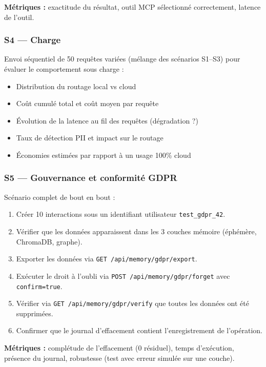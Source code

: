 \documentclass[12pt, a4paper]{article}
\begin{document}
\textbf{Métriques :} exactitude du résultat, outil MCP sélectionné correctement, latence de l'outil.

\subsubsection{S4 — Charge}

Envoi séquentiel de 50 requêtes variées (mélange des scénarios S1--S3) pour évaluer le comportement sous charge :

\begin{itemize}
  \item Distribution du routage local vs cloud
  \item Coût cumulé total et coût moyen par requête
  \item Évolution de la latence au fil des requêtes (dégradation ?)
  \item Taux de détection PII et impact sur le routage
  \item Économies estimées par rapport à un usage 100\% cloud
\end{itemize}

\subsubsection{S5 — Gouvernance et conformité GDPR}

Scénario complet de bout en bout :

\begin{enumerate}
  \item Créer 10 interactions sous un identifiant utilisateur \texttt{test\_gdpr\_42}.
  \item Vérifier que les données apparaissent dans les 3 couches mémoire (éphémère, ChromaDB, graphe).
  \item Exporter les données via \texttt{GET /api/memory/gdpr/export}.
  \item Exécuter le droit à l'oubli via \texttt{POST /api/memory/gdpr/forget} avec \texttt{confirm=true}.
  \item Vérifier via \texttt{GET /api/memory/gdpr/verify} que toutes les données ont été supprimées.
  \item Confirmer que le journal d'effacement contient l'enregistrement de l'opération.
\end{enumerate}

\textbf{Métriques :} complétude de l'effacement (0 résiduel), temps d'exécution, présence du journal, robustesse (test avec erreur simulée sur une couche).
\end{document}
